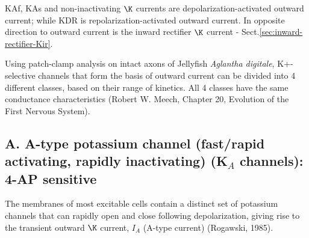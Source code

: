 KAf, KAs and non-inactivating $\K$ currents are depolarization-activated outward
current; while KDR is repolarization-activated outward current. In opposite
direction to outward current is the inward rectifier $\K$ current -
Sect.\ref{sec:inward-rectifier-Kir}.


\begin{mdframed}
Using patch-clamp analysis on intact axons of Jellyfish {\it Aglantha digitale},
K+-selective channels that form the basis of outward current can be divided into
4 different classes, based on their range of kinetics.
All 4 classes have the same conductance characteristics (Robert W. Meech,
Chapter 20, Evolution of the First Nervous System).

% 
% 

\end{mdframed}


\subsection{A. A-type potassium channel (fast/rapid activating, rapidly
inactivating) (K$_A$ channels): 4-AP sensitive}
\label{sec:A-type-K+current}
\label{sec:Ito_channel}

The membranes of most excitable cells contain a distinct set of potassium
channels that can rapidly open and close following depolarization, giving rise
to the transient outward $\K$ current, $I_A$ (A-type current) (Rogawski, 1985).

